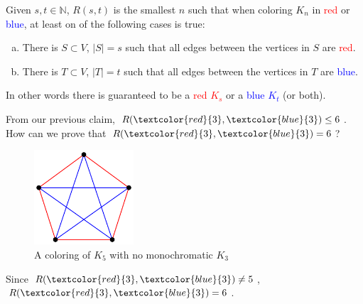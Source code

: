 \documentclass[00_complete]{subfiles}
\begin{document}
\begin{definition}
    Given $s,t \in \mathbb{N}$, $R(s,t)$ is the smallest $n$ such that when
    coloring $K_n$ in \textcolor{red}{red} or \textcolor{blue}{blue}, at least
    on of the following cases is true:
    \begin{enumerate}[a.] \tightlist
        \item There is $S \subset V$, $|S|=s$ such that all edges between the
            vertices in $S$ are \textcolor{red}{red}.
        \item There is $T \subset V$, $|T|=t$ such that all edges between the
            vertices in $T$ are \textcolor{blue}{blue}.
    \end{enumerate}
    In other words there is guaranteed to be a \textcolor{red}{red $K_s$} or a
    \textcolor{blue}{blue $K_t$} (or both).
\end{definition}
From our previous claim, $R(\textcolor{red}{3},\textcolor{blue}{3}) \leq 6$.
How can we prove that $R(\textcolor{red}{3},\textcolor{blue}{3})= 6$?
    \begin{figure}[ht]
        \centering
        \includegraphics[width=0.33\textwidth]{w12_k5}
        \caption{A coloring of $K_5$ with no monochromatic $K_3$}
    \end{figure}

Since $R(\textcolor{red}{3},\textcolor{blue}{3}) \neq 5$,
$R(\textcolor{red}{3},\textcolor{blue}{3}) = 6$.
\end{document}
